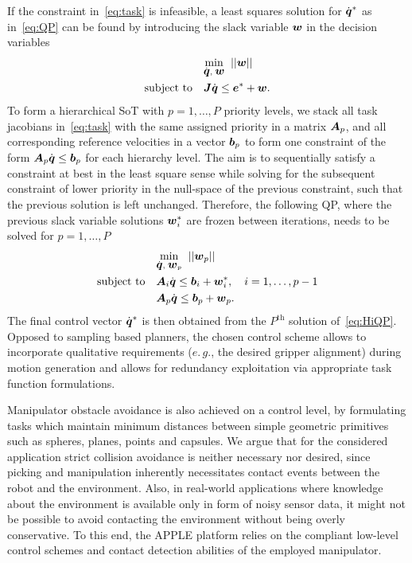 If the constraint in~\eqref{eq:task} is infeasible, a least squares solution for $\dot{\mbox{\boldmath $q$}}^*$ as
in~\eqref{eq:QP} can be found by introducing the slack variable $\mbox{\boldmath $w$}$ in the decision variables
%
\begin{align}\label{eq:iQP}
  &\underset{\dot{\mbox{\boldmath $q$}},\;\mbox{\boldmath $w$}}{\mbox{min}}\;\;||\mbox{\boldmath $w$}||\\
   \mbox{subject to} \quad &\mbox{\boldmath $J$}\dot{\mbox{\boldmath $q$}} \leq \mbox{\boldmath $e$}^* + \mbox{\boldmath $w$}. \nonumber
\end{align}
%
To form a hierarchical SoT with $p=1,\dots,P$ priority levels, we stack all task jacobians
in~\eqref{eq:task} with the same assigned priority in a matrix $\mbox{\boldmath $A$}_p$, and all corresponding
reference velocities in a vector $\mbox{\boldmath $b$}_p$ to form one constraint of the form
$\mbox{\boldmath $A$}_p\dot{\mbox{\boldmath $q$}}\leq \mbox{\boldmath $b$}_p$ for each hierarchy level. The aim is to sequentially satisfy
a constraint at best in the least square sense while solving for the subsequent constraint of lower
priority in the null-space of the previous constraint, such that the previous solution is left
unchanged. Therefore, the following QP, where the previous slack variable solutions $\mbox{\boldmath $w$}_i^*$
are frozen between iterations, needs to be solved for $p=1,\ldots,P$
%
\begin{align}\label{eq:HiQP}
  &\underset{\dot{\mbox{\boldmath $q$}},\;\mbox{\boldmath $w$}_p}{\mbox{min}}\;\;||\mbox{\boldmath $w$}_p||\\
   \mbox{subject to} \quad &\mbox{\boldmath $A$}_i\dot{\mbox{\boldmath $q$}} \leq \mbox{\boldmath $b$}_i + \mbox{\boldmath $w$}_i^*, \quad i=1,\dots,p-1 \nonumber \\
                           &\mbox{\boldmath $A$}_p\dot{\mbox{\boldmath $q$}} \leq \mbox{\boldmath $b$}_p + \mbox{\boldmath $w$}_p.  \nonumber 
\end{align}
%
The final control vector $\dot{\mbox{\boldmath $q$}}^*$ is then obtained from the $P^{\mbox{th}}$ solution
of~\eqref{eq:HiQP}. Opposed to sampling based planners, the chosen control scheme allows to
incorporate qualitative requirements ($e.\,g.$, the desired gripper alignment) during motion
generation and allows for redundancy exploitation via appropriate task function formulations.

Manipulator obstacle avoidance is also achieved on a control level, by formulating tasks which
maintain minimum distances between simple geometric primitives such as spheres, planes, points and
capsules. We argue that for the considered application strict collision avoidance is neither
necessary nor desired, since picking and manipulation inherently necessitates contact events between
the robot and the environment. Also, in real-world applications where knowledge about the
environment is available only in form of noisy sensor data, it might not be possible to avoid
contacting the environment without being overly conservative. To this end, the APPLE platform relies
on the compliant low-level control schemes and contact detection abilities of the employed
manipulator.
%
